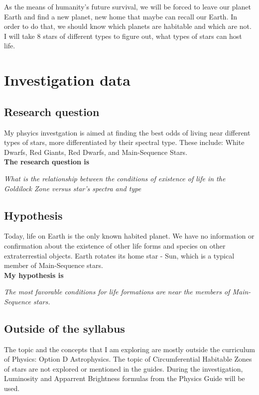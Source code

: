 \documentclass{article}
\begin{document}
As the means of humanity's future survival, we will be forced to leave our planet Earth and find a new planet, new home that maybe can recall our Earth. In order to do that, we should know which planets are habitable and which are not. I will take 8 stars of different types to figure out, what types of stars can host life.\\

\section{Investigation data}

\subsection{Research question}

My phsyics investgation is aimed at finding the best odds of living near different types of stars, more differentiated by their spectral type. These include: White Dwarfs, Red Giants, Red Dwarfs, and Main-Sequence Stars.\\

\textbf{The research question is}

\textit{What is the relationship between the conditions of existence of life in the Goldilock Zone versus star's spectra and type }

\subsection{Hypothesis}

Today, life on Earth is the only known habited planet. We have no information or confirmation about the existence of other life forms and species on other extraterrestial objects. Earth rotates its home star - Sun, which is a typical member of Main-Sequence stars.\\

\textbf{My hypothesis is}

  \textit{The most favorable conditions for life formations are near the members of Main-Sequence stars.}

  \subsection{Outside of the syllabus}

  The topic and the concepts that I am exploring are mostly outside the curriculum of Physics: Option D Astrophysics. The topic of Circumferential Habitable Zones of stars are not explored or mentioned in the guides. During the investigation, Luminosity and Apparrent Brightness formulas from the Physics Guide will be used. 
\end{document}
